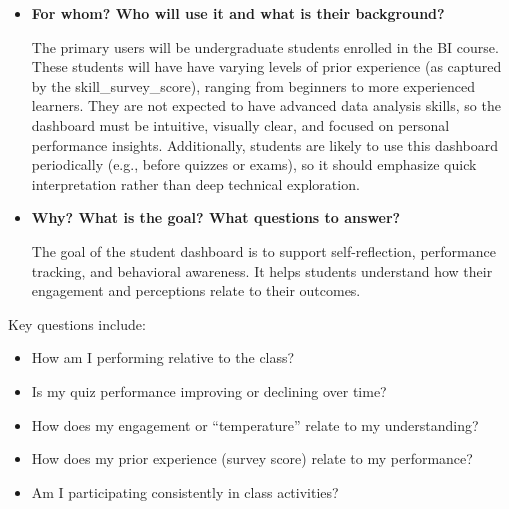 \documentclass[
]{article}
\providecommand{\tightlist}{%
  \setlength{\itemsep}{0pt}\setlength{\parskip}{0pt}}
\begin{document}
\begin{itemize}
\item
  \textbf{For whom? Who will use it and what is their background?}

  The primary users will be undergraduate students enrolled in the BI
  course. These students will have have varying levels of prior
  experience (as captured by the skill\_survey\_score), ranging from
  beginners to more experienced learners. They are not expected to have
  advanced data analysis skills, so the dashboard must be intuitive,
  visually clear, and focused on personal performance insights.
  Additionally, students are likely to use this dashboard periodically
  (e.g., before quizzes or exams), so it should emphasize quick
  interpretation rather than deep technical exploration.
\item
  \textbf{Why? What is the goal? What questions to answer?}

  The goal of the student dashboard is to support self-reflection,
  performance tracking, and behavioral awareness. It helps students
  understand how their engagement and perceptions relate to their
  outcomes.
\end{itemize}

Key questions include:

\begin{itemize}
\tightlist
\item
  How am I performing relative to the class?
\item
  Is my quiz performance improving or declining over time?
\item
  How does my engagement or ``temperature'' relate to my understanding?
\item
  How does my prior experience (survey score) relate to my performance?
\item
  Am I participating consistently in class activities?
\end{itemize}
\end{document}
